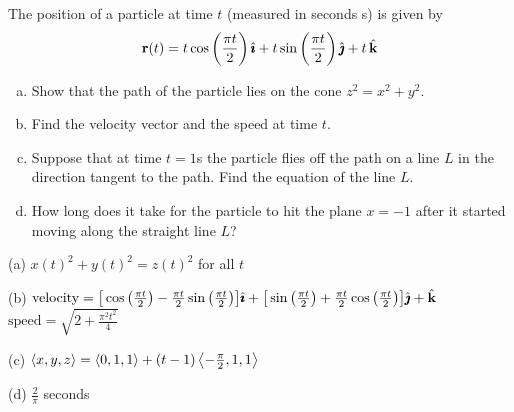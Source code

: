 \begin{question} [M200 2002D] %
The position of a particle at time $t$ (measured in seconds s) 
is given by
\begin{equation*}
\mathbf{r}(t)=t\cos\left(\frac{\pi t}{2}\right)\hat{\pmb{\imath}}
         +t\sin\left(\frac{\pi t}{2}\right)\hat{\pmb{\jmath}} +t\,\hat{\mathbf{k}}
\end{equation*}
\begin{enumerate}[(a)]
\item
Show that the path of the particle lies on the cone $z^2=x^2+y^2$.
\item
Find the velocity vector and the speed at time $t$.
\item
Suppose that at time $t=1$s the particle flies off the path
on a line $L$ in the direction tangent to the path. Find the equation of
the line $L$.
\item
How long does it take for the particle to hit the plane $x=-1$
after it started moving along the straight line $L$?
\end{enumerate}
\end{question}

%

\begin{answer}
(a) $x(t)^2+y(t)^2=z(t)^2$ for all $t$ 

(b) $\text{velocity}= \big[\cos\big(\tfrac{\pi t}{2}\big)
           -\tfrac{\pi t}{2}\sin\big(\tfrac{\pi t}{2}\big)\big]\hat{\pmb{\imath}}
         +\big[\sin\big(\tfrac{\pi t}{2}\big)
           +\tfrac{\pi t}{2}\cos\big(\tfrac{\pi t}{2}\big)\big]\hat{\pmb{\jmath}} +\hat{\mathbf{k}}$
\quad
$\text{speed}=\sqrt{2+\frac{\pi^2 t^2}{4}}$

(c) $\left< x,y,z\right> = \left< 0,1,1\right> +(t-1)\left< -\frac{\pi}{2},1,1\right>$

(d)   $\frac{2}{\pi}$ seconds
\end{answer}

